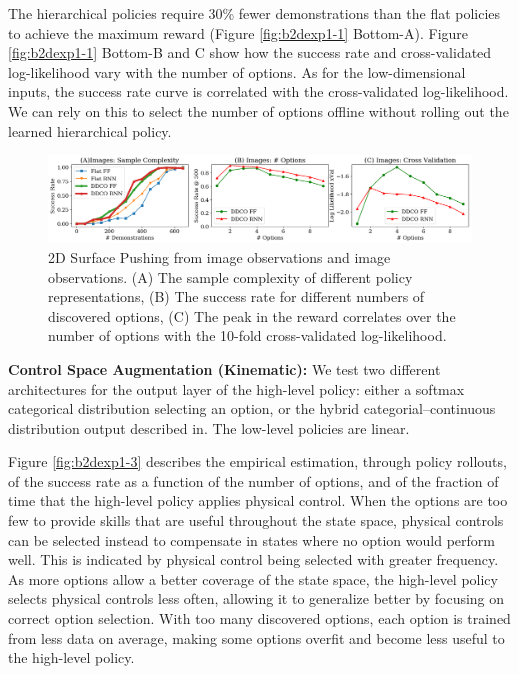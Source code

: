   The hierarchical policies require 30\% fewer demonstrations than the flat policies to achieve the maximum reward (Figure \ref{fig:b2dexp1-1} Bottom-A).
Figure \ref{fig:b2dexp1-1} Bottom-B and C show how the success rate and cross-validated log-likelihood vary with the number of options.
As for the low-dimensional inputs, the success rate curve is correlated with the cross-validated log-likelihood.
We can rely on this to select the number of options offline without rolling out the learned hierarchical policy.

\begin{figure}[ht!]
    \centering
    \includegraphics[width=\textwidth]{ddco-experiments/exp1-2.png}
    \caption{2D Surface Pushing from image observations and image observations. (A) The sample complexity of different policy representations, (B) The success rate for different numbers of discovered options, (C) The peak in the reward correlates over the number of options with the 10-fold cross-validated log-likelihood. \label{fig:b2dexp1-2}}
\end{figure}

\vspace{0.25em}\noindent\textbf{Control Space Augmentation (Kinematic): } 
We test two different architectures for the output layer of the high-level policy: either a softmax categorical distribution selecting an option, or the hybrid categorial--continuous distribution output described in.
The low-level policies are linear.

Figure \ref{fig:b2dexp1-3} describes the empirical estimation, through policy rollouts, of the success rate as a function of the number of options, and of the fraction of time that the high-level policy applies physical control.
When the options are too few to provide skills that are useful throughout the state space, physical controls can be selected instead to compensate in states where no option would perform well. This is indicated by physical control being selected with greater frequency. As more options allow a better coverage of the state space, the high-level policy selects physical controls less often, allowing it to generalize better by focusing on correct option selection. With too many discovered options, each option is trained from less data on average, making some options overfit and become less useful to the high-level policy.

